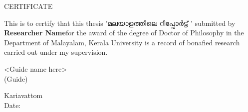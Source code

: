 \newpage
\thispagestyle{empty}

\begin{center}

{\gentium
\huge{CERTIFICATE}
}\\[0.5cm]

\end{center}

{\gentium
\normalsize This is to certify that this thesis} {\gayathri'മലയാളത്തിലെ റിപ്പോർട്ട് '} {\gentium submitted by \textbf{Researcher Name}for the award of the degree of Doctor of Philosophy in the Department of Malayalam, Kerala University is a record of bonafied research carried out under my supervision.}\\[1.0cm]


\vspace{.5in}


\begin{flushright}
<Guide name here>\\
(Guide)\\[1.5cm]

\end{flushright}

\begin{flushleft}
Kariavattom\\
Date:
\end{flushleft}
